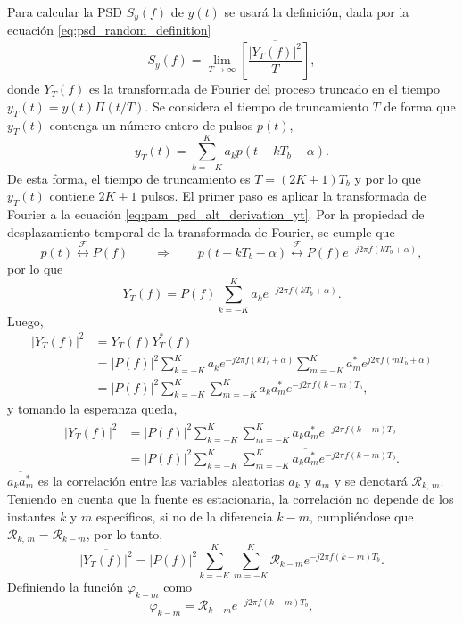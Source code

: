 \documentclass[a4paper]{article}
\begin{document}
Para calcular la PSD \(S_y(f)\) de \(y(t)\) se usará la definición, dada por la ecuación \ref{eq:psd_random_definition}
\[
 S_y(f)=\lim_{T\to\infty}\overline{\left[\frac{|Y_T(f)|^2}{T}\right]},
\]
 donde \(Y_T(f)\) es la transformada de Fourier del proceso truncado en el tiempo \(y_T(t)=y(t)\Pi(t/T)\). 
 Se considera el tiempo de truncamiento \(T\) de forma que \(y_T(t)\) contenga un número entero de pulsos \(p(t)\),
 \begin{equation}\label{eq:pam_psd_alt_derivation_yt}
  y_T(t)= \sum_{k=-K}^{K}a_kp(t-kT_b-\alpha).
 \end{equation}
 De esta forma, el tiempo de truncamiento es \(T=(2K+1)T_b\) y por lo que \(y_T(t)\) contiene \(2K+1\) pulsos. El primer paso es aplicar la transformada de Fourier a la ecuación \ref{eq:pam_psd_alt_derivation_yt}. Por la propiedad de desplazamiento temporal de la transformada de Fourier, se cumple que
 \[
  p(t)\overset{\mathcal{F}}{\longleftrightarrow}P(f)\qquad\Rightarrow\qquad p(t-kT_b-\alpha)\overset{\mathcal{F}}{\longleftrightarrow}P(f)e^{-j2\pi f(kT_b+\alpha)},
 \]
 por lo que
 \[
  Y_T(f)=P(f)\sum_{k=-K}^{K}a_ke^{-j2\pi f(kT_b+\alpha)}.
 \]
Luego,
\begin{align*}
 |Y_T(f)|^2&=Y_T(f)Y_T^*(f)\\
   &=|P(f)|^2\sum_{k=-K}^{K}a_ke^{-j2\pi f(kT_b+\alpha)}\sum_{m=-K}^{K}a_m^*e^{j2\pi f(mT_b+\alpha)}\\
   &=|P(f)|^2\sum_{k=-K}^{K}\sum_{m=-K}^{K}a_ka_m^*e^{-j2\pi f(k-m)T_b},
\end{align*}
y tomando la esperanza queda,
\begin{align*}
 \overline{|Y_T(f)|^2}&=\overline{|P(f)|^2\sum_{k=-K}^{K}\sum_{m=-K}^{K}a_ka_m^*e^{-j2\pi f(k-m)T_b}}\\
  &=|P(f)|^2\sum_{k=-K}^{K}\sum_{m=-K}^{K}\overline{a_ka_m^*}e^{-j2\pi f(k-m)T_b}.
\end{align*}
\(\overline{a_ka_m^*}\) es la correlación entre las variables aleatorias \(a_k\) y \(a_m\) y se denotará \(\mathcal{R}_{k,\,m}\). Teniendo en cuenta que la fuente es estacionaria, la correlación no depende de los instantes \(k\) y \(m\) específicos, si no de la diferencia \(k-m\), cumpliéndose que \(\mathcal{R}_{k,\,m}=\mathcal{R}_{k-m}\), por lo tanto,
 \[
  \overline{|Y_T(f)|^2}=|P(f)|^2\sum_{k=-K}^{K}\sum_{m=-K}^{K}\mathcal{R}_{k-m}e^{-j2\pi f(k-m)T_b}.
 \]
Definiendo la función \(\varphi_{k-m}\) como
\begin{equation}\label{eq:pam_psd_alt_derivation_phi}
  \varphi_{k-m}=\mathcal{R}_{k-m}e^{-j2\pi f(k-m)T_b},
\end{equation}
\end{document}
